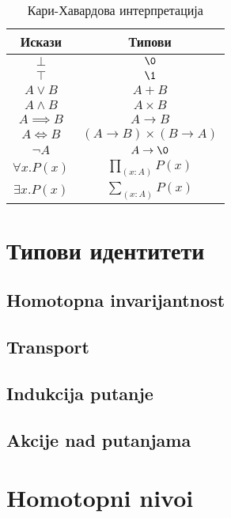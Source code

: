 \documentclass[12pt,oneside]{memoir}
\begin{document}
\begin{table}
    \begin{center}
        \begin{tabular}[c]{c c}
            Искази & Типови \\
            \hline%
            $\bot$ & $\0$ \\
            $\top$ & $\1$ \\
            $A \lor B$ & $A + B$ \\
            $A \land B$ & $A \times B$ \\
            $A \implies B$ & $A \to B$ \\
            $A \iff B$ & $(A \to B) \times (B \to A)$ \\
            $\neg A$ & $A \to \0$ \\
            $\forall x. P(x)$ & $\prod_{(x : A)} P(x)$ \\
            $\exists x. P(x)$ & $\sum_{(x : A)} P(x)$
        \end{tabular}
    \end{center}
    \caption{Кари\--Хавардова интерпретација}
    \label{table:curry_howard}
\end{table}

\section{Типови идентитети}

\subsection{Homotopna invarijantnost}

\subsection{Transport}

\subsection{Indukcija putanje}

\subsection{Akcije nad putanjama}

\section{Homotopni nivoi}
\end{document}
